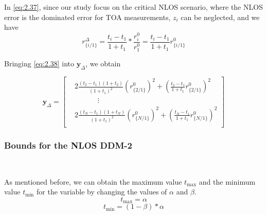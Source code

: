 \documentclass[journal]{IEEEtran}
\begin{document}
In \eqref{eq:2.37}, since our study focus on the critical NLOS scenario, where the NLOS error is the dominated error for TOA measurements, ${z}_{i}$ can be neglected, and we have
\begin{equation}\label{eq:2.38}
{{r}_{\{i/1\}}^{\Delta}} = \frac{{t_i}-{t_1}}{1+{t_1}} * \frac{{r_{i}^{0}}}{{r_{1}^{0}}}
= \frac{{t_i}-{t_1}}{1+{t_1}}{{r}_{\{i/1\}}^{0}}
\end{equation}

Bringing \eqref{eq:2.38} into $\mathbf{y}_{\Delta}$, we obtain
\begin{small}
\begin{equation}\label{eq:2.381}
\mathbf{y}_{\Delta}\!=\!\left[ \begin{aligned}
  &2\frac{{\left({t_2}\!-\!{t_1}\right)\left({1\!+\!{t_2}}\right)}}{{\left(1\!+\!{t_1}\right)}^2}\left({{r}_{\{2/1\}}^{0}}\right)^2
 \!+\!\left({\frac{{t_2}\!-\!{t_1}}{1\!+\!{t_1}}{{r}_{\{2/1\}}^{0}}}\right)^2\\
 & \begin{matrix}
   {} & {}  \\
\end{matrix}\begin{matrix}
   {}  \\
\end{matrix}\begin{matrix}
   {}  \\
\end{matrix}\vdots  \\
 &2\frac{{\left({t_N}\!-\!{t_1}\right)\left({1\!+\!{t_N}}\right)}}{{\left(1\!+\!{t_1}\right)}^2}\left({{r}_{\{N/1\}}^{0}}\right)^2
  \!+\!\left({\frac{{t_N}\!-\!{t_1}}{1\!+\!{t_1}}{{r}_{\{N/1\}}^{0}}}\right)^2 \\
\end{aligned} \right]
\end{equation}
\end{small}
\subsubsection{Bounds for the NLOS DDM-2}
\

As mentioned before, we can obtain the maximum value ${t_{\max}}$ and the minimum value ${t_{\min}}$ for the variable by changing the values of $\alpha$ and $\beta$.
\begin{equation}\label{eq:2.40}
   {t_{\max}}=\alpha
\end{equation}
\begin{equation}\label{eq:2.41}
   {t_{\min}}=\left(1-{\beta}\right)*{\alpha}
\end{equation}
\end{document}
